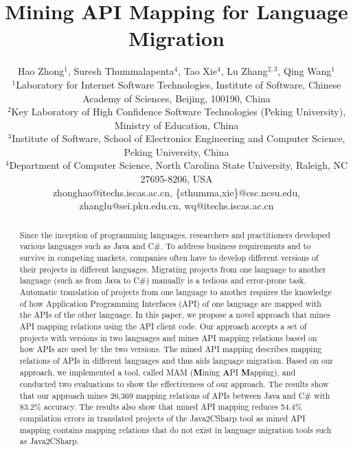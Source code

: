 \documentclass{sig-alternate}
\begin{document}

\title{Mining API Mapping for Language Migration}

\author{
Hao Zhong$^{1}$, Suresh Thummalapenta$^4$, Tao Xie$^4$, Lu Zhang$^{2,3}$, Qing Wang$^{1}$\\
\small{$^1$Laboratory for Internet Software Technologies, Institute of Software, Chinese Academy of Sciences, Beijing, 100190, China}\\
\small{$^2$Key Laboratory of High Confidence Software Technologies (Peking University), Ministry of Education, China}\\
\small{$^3$Institute of Software, School of Electronics Engineering and Computer Science, Peking University, China} \\
\small{$^4$Department of Computer Science, North Carolina State University, Raleigh, NC 27695-8206, USA}\\
\small{zhonghao@itechs.iscas.ac.cn, \{sthumma,xie\}@csc.ncsu.edu,
zhanglu@sei.pku.edu.cn, wq@itechs.iscas.ac.cn}}

\maketitle
\thispagestyle{empty}

\begin{abstract}
Since the inception of programming languages, researchers and
practitioners developed various languages such as Java and C\#. 
To address business requirements and to survive in competing markets, companies
often have to develop different versions of their projects in different languages.
Migrating projects from one language to another language (such as from Java to C\#) manually
is a tedious and error-prone task. Automatic translation
of projects from one language to another requires the knowledge
of how Application Programming Interfaces (API) of one language
are mapped with the APIs of the other language.  
In this paper, we propose a novel approach that mines API mapping relations
using the API client code. Our approach accepts a set of
projects with versions in two languages and mines API mapping
relations based on how APIs are used by the two versions.
The mined API mapping describes mapping relations of APIs in different
languages and thus aids language migration. Based on our approach,
we implemented a tool, called MAM (\textbf{M}ining \textbf{A}PI
\textbf{M}apping), and conducted two evaluations to show
the effectiveness of our approach. The results show that our approach mines 26,369 mapping
relations of APIs between Java and C\# with 83.2\% accuracy. The
results also show that mined API mapping reduces 54.4\% compilation
errors in translated projects of the Java2CSharp tool as mined API
mapping contains mapping relations that do not exist in language
migration tools such as Java2CSharp.
\end{abstract}
\end{document}
